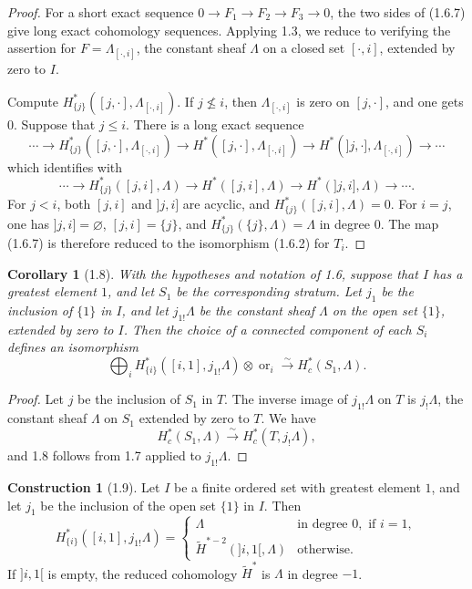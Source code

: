 \documentclass[11pt]{article}
\newtheorem{corollary}[theorem]{Corollary}
\theoremstyle{definition}
\newtheorem{construction}[theorem]{Construction}
\newcommand{\ornt}{\operatorname{or}}
\begin{document}
\begin{proof}
For a short exact sequence $0\to F_1\to F_2\to F_3\to 0$, the two sides of (1.6.7) give long exact cohomology sequences.  Applying 1.3, we reduce to verifying the assertion for $F=\Lambda_{[\cdot,i]}$, the constant sheaf $\Lambda$ on a closed set $[\cdot,i]$, extended by zero to $I$.

Compute $H^*_{\{j\}}([j,\cdot],\Lambda_{[\cdot,i]})$.  If $j\nleq i$, then $\Lambda_{[\cdot,i]}$ is zero on $[j,\cdot]$, and one gets $0$.  Suppose that $j\leq i$.  There is a long exact sequence
\[
\cdots\to H^*_{\{j\}}([j,\cdot],\Lambda_{[\cdot,i]})\to H^*([j,\cdot],\Lambda_{[\cdot,i]})\to H^*(]j,\cdot],\Lambda_{[\cdot,i]})\to\cdots
\]
which identifies with
\[
\cdots\to H^*_{\{j\}}([j,i],\Lambda)\to H^*([j,i],\Lambda)\to H^*(]j,i],\Lambda)\to\cdots .
\]
For $j<i$, both $[j,i]$ and $]j,i]$ are acyclic, and $H^*_{\{j\}}([j,i],\Lambda)=0$.  For $i=j$, one has $]j,i]=\varnothing$, $[j,i]=\{j\}$, and $H^*_{\{j\}}(\{j\},\Lambda)=\Lambda$ in degree $0$.  The map (1.6.7) is therefore reduced to the isomorphism (1.6.2) for $T_i$.
\end{proof}

\begin{corollary}[1.8]
With the hypotheses and notation of 1.6, suppose that $I$ has a greatest element $1$, and let $S_1$ be the corresponding stratum.  Let $j_1$ be the inclusion of $\{1\}$ in $I$, and let $j_{1!}\Lambda$ be the constant sheaf $\Lambda$ on the open set $\{1\}$, extended by zero to $I$.  Then the choice of a connected component of each $S_i$ defines an isomorphism
\begin{equation}
\bigoplus_i H^*_{\{i\}}([i,1],j_{1!}\Lambda)\otimes\ornt_i\xrightarrow{\sim}H_c^*(S_1,\Lambda).\tag{1.8.1}
\end{equation}
\end{corollary}

\begin{proof}
Let $j$ be the inclusion of $S_1$ in $T$.  The inverse image of $j_{1!}\Lambda$ on $T$ is $j_!\Lambda$, the constant sheaf $\Lambda$ on $S_1$ extended by zero to $T$.  We have
\[
H_c^*(S_1,\Lambda)\xrightarrow{\sim}H_c^*(T,j_!\Lambda),
\]
and 1.8 follows from 1.7 applied to $j_{1!}\Lambda$.
\end{proof}

\begin{construction}[1.9]
Let $I$ be a finite ordered set with greatest element $1$, and let $j_1$ be the inclusion of the open set $\{1\}$ in $I$.  Then
\[
H^*_{\{i\}}([i,1],j_{1!}\Lambda)=
\begin{cases}
\Lambda & \text{in degree }0,\text{ if }i=1,\\
\widetilde H^{*-2}(]i,1[,\Lambda) & \text{otherwise.}
\end{cases}
\]
If $]i,1[$ is empty, the reduced cohomology $\widetilde H^*$ is $\Lambda$ in degree $-1$.
\end{construction}
\end{document}
